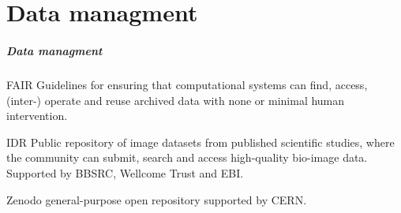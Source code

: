\documentclass[ignorenonframetext,aspectratio=169,10pt,xcolor=table]{beamer}
\begin{document}
\part{Data managment}
\frame{\partpage}

\begin{frame} \frametitle{Data managment}

  \begin{block}{FAIR}
    Guidelines for ensuring that computational systems can find, access,
    (inter-) operate and reuse archived data with none or minimal human
    intervention.
  \end{block}

  \begin{block}{IDR}
    Public repository of image datasets from published scientific studies, where
    the community can submit, search and access high-quality bio-image data.
    Supported by BBSRC, Wellcome Trust and EBI.
  \end{block}

  \begin{block}{Zenodo}
    general-purpose open repository supported by CERN.
  \end{block}

     

\end{frame}
\end{document}
